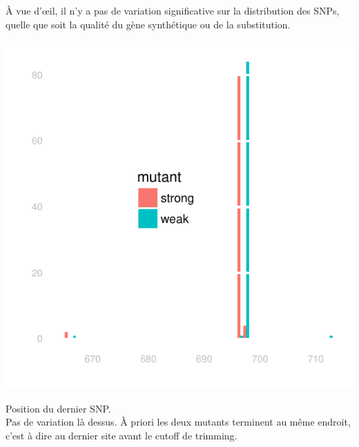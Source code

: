 \documentclass[a4paper]{tufte-handout}
\begin{document}
À vue d'œil, il n'y a pas de variation significative sur la distribution des
SNPs, quelle que soit la qualité du gène synthétique ou de la substitution.

\begin{marginfigure}
  \includegraphics[width=\linewidth]{../end_switch.pdf}
  \caption{Position du dernier SNP.\\
    Pas de variation là dessus. À priori les deux mutants terminent au même
    endroit, c'est à dire au dernier site avant le cutoff de trimming. 
  }
\end{marginfigure}
\end{document}

